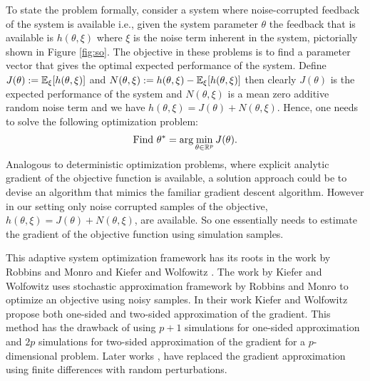 \documentclass[letterpaper, 10 pt, conference]{ieeeconf}  %
\begin{document}
To state the problem formally, consider a system where noise-corrupted feedback of the 
system is available i.e., given the system parameter $\theta$ the feedback that is 
available is $h(\theta, \xi)$ where $\xi$ is the noise term inherent in the system, 
pictorially shown in Figure \ref{fig:so}. The objective in these problems is to find a 
parameter vector that gives the optimal expected performance of the system. 
Define $J(\theta):=\mathbb{E}_{\xi}[h(\theta, \xi)]$ and 
$N(\theta,\xi):=h(\theta, \xi)-\mathbb{E}_{\xi}[h(\theta, \xi)]$ then clearly $J(\theta)$ is the expected 
performance of the system and $N(\theta,\xi)$ is a 
mean zero additive random noise term and we have $h(\theta, \xi)=J(\theta)+N(\theta,\xi)$. Hence, one 
needs to solve the following optimization problem:
\begin{align}
\mbox{Find } \theta^* = \arg\min_{\theta \in \mathbb{R}^p} J(\theta). \label{eq:pb}
\end{align}
Analogous to deterministic optimization problems, where explicit analytic gradient of the 
objective function is available, a solution approach could be to devise an algorithm that 
mimics the familiar gradient descent algorithm. However in our setting only noise corrupted 
samples of the objective, $h(\theta, \xi)=J(\theta)+N(\theta,\xi)$, are available. So one essentially needs to estimate the gradient 
of the objective function using simulation samples.

This adaptive system optimization framework has its roots in the work by 
Robbins and Monro \cite{robbins1951} and Kiefer and Wolfowitz \cite{kiefer1952}. 
The work by Kiefer and Wolfowitz uses stochastic approximation framework by 
Robbins and Monro to optimize an objective using noisy samples. In their work
Kiefer and Wolfowitz \cite{kiefer1952} propose both 
one-sided and two-sided approximation of the gradient. 
This method has the drawback of using $p+1$ simulations for one-sided approximation and
$2p$ simulations for two-sided approximation of the gradient for a 
$p$-dimensional problem. Later works \cite{kushcla},\cite{spall} have replaced the 
gradient approximation using finite differences with random perturbations.
\end{document}
